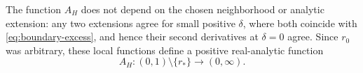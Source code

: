 The function $A_H$ does not depend on the chosen neighborhood or analytic
extension: any two extensions agree for small positive $\delta$, where
both coincide with \eqref{eq:boundary-excess}, and hence their second derivatives
at $\delta=0$ agree.  Since $r_0$ was arbitrary, these local functions
define a positive real-analytic function
\begin{equation*}
  A_H:(0,1)\setminus\{r_*\}\longrightarrow(0,\infty).
\end{equation*}
